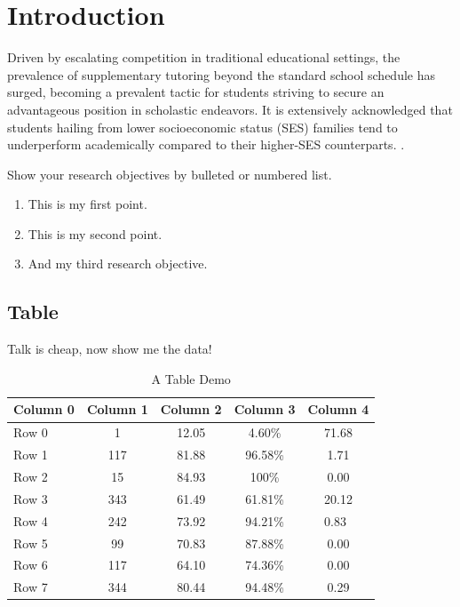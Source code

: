 \section{Introduction}
\begin{spacing}{2}
    \par
    Driven by escalating competition in traditional educational settings, the prevalence of supplementary tutoring beyond the standard school schedule has surged, becoming a prevalent tactic for students striving to secure an advantageous position in scholastic endeavors. It is extensively acknowledged that students hailing from lower socioeconomic status (SES) families tend to underperform academically compared to their higher-SES counterparts. \citep{zhou2015family}.  
    
    \par
    Show your research objectives by bulleted or numbered list. 
    
    \begin{enumerate}
        \item This is my first point. 
        \item This is my second point. 
        \item And my third research objective. 
    \end{enumerate}
    
    \par
    
    \subsection{Table}    
    \par
    Talk is cheap, now show me the data! 
    
    \begin{table}[h]
    	\caption{A Table Demo}
    	\begin{tabular}{l c c c c}
    		\toprule
    		Column 0 & Column 1 & Column 2 &  Column 3 & Column 4 \\
    		\midrule
    		Row 0 		& 1 & 12.05 & 4.60\% & 71.68 \\
    		Row 1 		& 117 & 81.88 & 96.58\% & 1.71 \\
    		Row 2 		& 15 & 84.93 & 100\% & 0.00 \\
    		Row 3 		& 343 & 61.49 & 61.81\% & 20.12 \\
    		Row 4 		& 242 & 73.92 & 94.21\% & 0.83\ \\
    		Row 5 		& 99 & 70.83 & 87.88\% & 0.00  \\
    		Row 6 		& 117 & 64.10 & 74.36\% & 0.00  \\
    		Row 7 		& 344 & 80.44 & 94.48\% & 0.29 \\
    		\bottomrule
    	\end{tabular}
    \end{table}
    

\end{spacing}
